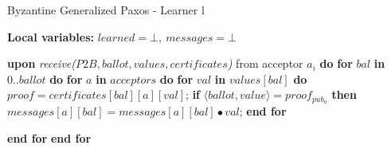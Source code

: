 \begin{algorithm}
	\caption{Byzantine Generalized Paxos - Learner l}
	\label{BFT-Learn}
	\textbf{Local variables: } $learned = \bot,\ messages = \bot$ 
	\begin{algorithmic}[1]
		\State \textbf{upon} \textit{receive($P2B, ballot, values, certificates$)} from acceptor $a_i$ \textbf{do}
		\State \hspace{\algorithmicindent} \textbf{for} $bal$ \textbf{in} $0..ballot$ \textbf{do}
		\State \hspace{\algorithmicindent}\hspace{\algorithmicindent} \textbf{for} $a$ \textbf{in} $acceptors$ \textbf{do} 
		\State \hspace{\algorithmicindent}\hspace{\algorithmicindent}\hspace{\algorithmicindent} \textbf{for} $val$ \textbf{in} $values[bal]$ \textbf{do} 
		\State \hspace{\algorithmicindent}\hspace{\algorithmicindent}\hspace{\algorithmicindent}\hspace{\algorithmicindent} $proof = certificates[bal][a][val]$;
		\State \hspace{\algorithmicindent}\hspace{\algorithmicindent}\hspace{\algorithmicindent}\hspace{\algorithmicindent} \textbf{if} $\langle ballot, value \rangle = proof_{pub_a}$ \textbf{then}
		\State \hspace{\algorithmicindent}\hspace{\algorithmicindent}\hspace{\algorithmicindent}\hspace{\algorithmicindent}\hspace{\algorithmicindent} $messages[a][bal] =messages[a][bal] \bullet val$;
		\State \hspace{\algorithmicindent}\hspace{\algorithmicindent}\hspace{\algorithmicindent} \textbf{end for}

		\State \hspace{\algorithmicindent}\hspace{\algorithmicindent} \textbf{end for}
		\State \hspace{\algorithmicindent} \textbf{end for}



\end{algorithmic}
\end{algorithm}
